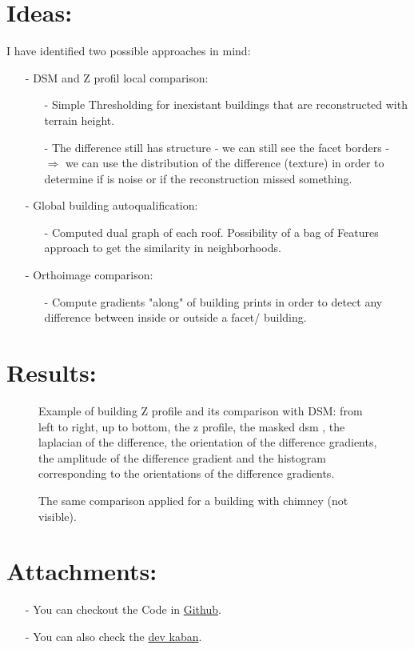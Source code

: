 \documentclass[a4paper, 11pt]{article}
\begin{document}
	\section*{Ideas:}
	I have identified two possible approaches in mind:
	\begin{itemize}
		\item[-] DSM and Z profil local comparison:
		\begin{itemize}
			\item[-] Simple Thresholding for inexistant buildings that are reconstructed with terrain height.
			\item[-] The difference still has structure - we can still see the facet borders - $\Rightarrow$ we can use the distribution of the difference (texture)  in order to determine if is noise or if the reconstruction missed something.
		\end{itemize}
		\item[-] Global building autoqualification:
		\begin{itemize}
			\item[-] Computed dual graph of each roof. Possibility of a bag of Features approach to get the similarity in neighborhoods.
		\end{itemize}

		\item[-] Orthoimage comparison:
		\begin{itemize}
			\item[-] Compute gradients "along" of building prints in order to detect any difference between inside or outside a facet/ building.
		\end{itemize}
	\end{itemize}

	\section*{Results:}
	\begin{figure}[H]
		\begin{center}
			\caption{\label{img::comparison} Example of building Z profile and its comparison with DSM: from left to right, up to bottom, the z profile, the  masked dsm , the laplacian of the difference, the orientation of the difference gradients, the amplitude of the difference gradient and the histogram corresponding to the orientations of the difference gradients.}
		\end{center}
	\end{figure}

	\begin{figure}[H]
		\begin{center}
			\caption{\label{img::comparison_bis} The same comparison applied for a building with chimney (not visible).}
		\end{center}
	\end{figure}

\section*{Attachments:}

\begin{itemize}
	\item[-] You can checkout the Code in \href{https://github.com/Ethiy/3DSceneModel}{Github}.
	\item[-] You can also check the \href{https://github.com/Ethiy/3DSceneModel/projects/1}{dev kaban}.
\end{itemize}
\end{document}
